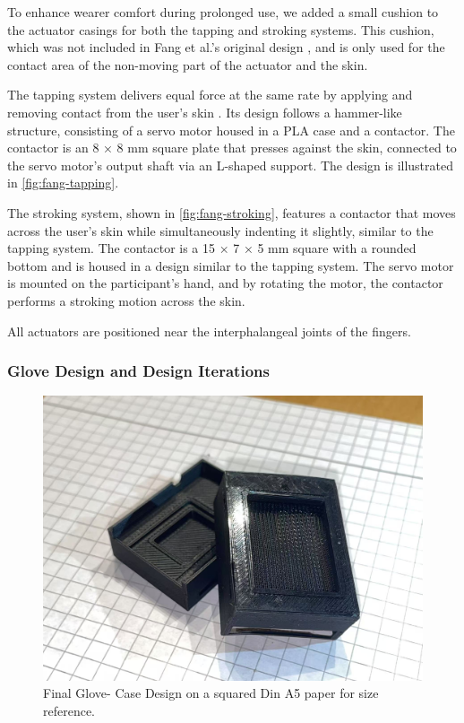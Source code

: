 To enhance wearer comfort during prolonged use, we added a small cushion to the actuator casings for both the tapping and stroking systems. This cushion, which was not included in Fang et al.’s original design \cite{Fang2023}, and is only used for the contact area of the non-moving part of the actuator and the skin.

The tapping system delivers equal force at the same rate by applying and removing contact from the user’s skin \cite{Fang2023}. Its design follows a hammer-like structure, consisting of a servo motor housed in a PLA case and a contactor. The contactor is an 8 × 8 mm square plate that presses against the skin, connected to the servo motor’s output shaft via an L-shaped support. The design is illustrated in \autoref{fig:fang-tapping}.

The stroking system, shown in \autoref{fig:fang-stroking}, features a contactor that moves across the user’s skin while simultaneously indenting it slightly, similar to the tapping system. The contactor is a 15 × 7 × 5 mm square with a rounded bottom and is housed in a design similar to the tapping system. The servo motor is mounted on the participant’s hand, and by rotating the motor, the contactor performs a stroking motion across the skin.

All actuators are positioned near the interphalangeal joints of the fingers.











\subsubsection{Glove Design and Design Iterations}
\label{Glove_Design_Iteration}
\begin{figure}
    \centering
    \includegraphics[width=0.5\linewidth]{src/pictures/GloveDesigns/cases.jpg}
    \caption{Final Glove- Case Design on a squared Din A5 paper for size reference.}
    \label{fig:cases}
\end{figure}

